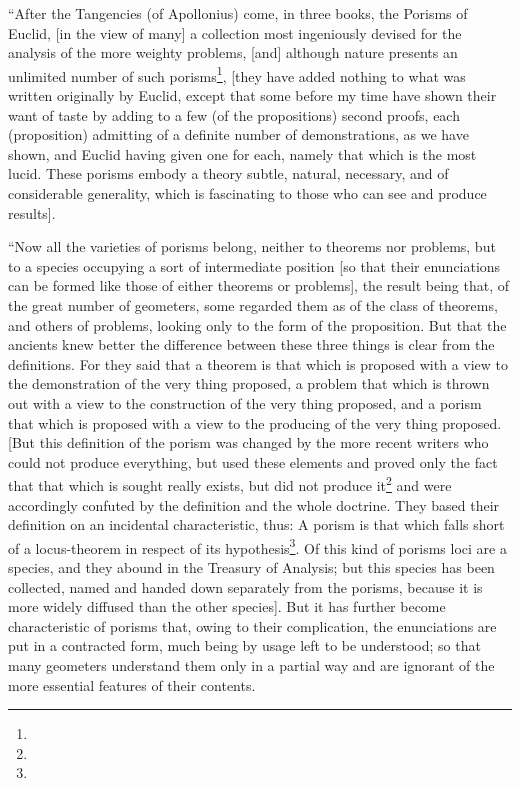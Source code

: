 ``After the Tangencies (of Apollonius) come, in three books, the Porisms of Euclid, [in the view of many] a collection most ingeniously devised for the analysis of the more weighty problems, [and] although nature presents an unlimited number of such porisms\footnote{}, [they have added nothing to what was written originally by Euclid, except that some before my time have shown their want of taste by adding to a few (of the propositions) second proofs, each (proposition) admitting of a definite number of demonstrations, as we have shown, and Euclid having given one for each, namely that which is the most lucid. These porisms embody a theory subtle, natural, necessary, and of considerable generality, which is fascinating to those who can see and produce results].

``Now all the varieties of porisms belong, neither to theorems nor problems, but to a species occupying a sort of intermediate position [so that their enunciations can be formed like those of either theorems or problems], the result being that, of the great number of geometers, some regarded them as of the class of theorems, and others of problems, looking only to the form of the proposition. But that the ancients knew better the difference between these three things is clear from the definitions. For they said that a theorem is that which is proposed with a view to the demonstration of the very thing proposed, a problem that which is thrown out with a view to the construction of the very thing proposed, and a porism that which is proposed with a view to the producing of the very thing proposed. [But this definition of the porism was changed by the more recent writers who could not produce everything, but used these elements and proved only the fact that that which is sought really exists, but did not produce it\footnote{} and were accordingly confuted by the definition and the whole doctrine. They based their definition on an incidental characteristic, thus: A porism is that which falls short of a locus-theorem in respect of its hypothesis\footnote{}. Of this kind of porisms loci are a species, and they abound in the Treasury of Analysis; but this species has been collected, named and handed down separately from the porisms, because it is more widely diffused than the other species]. But it has further become characteristic of porisms that, owing to their complication, the enunciations are put in a contracted form, much being by usage left to be understood; so that many geometers understand them only in a partial way and are ignorant of the more essential features of their contents.

